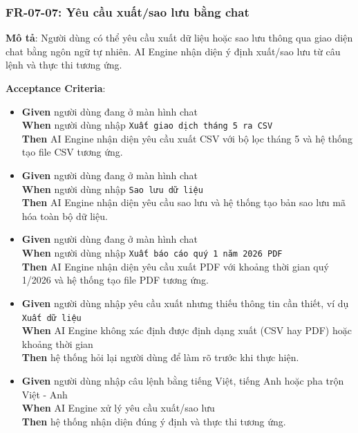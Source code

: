 \subsubsection{FR-07-07: Yêu cầu xuất/sao lưu bằng chat}

\textbf{Mô tả}: Người dùng có thể yêu cầu xuất dữ liệu hoặc sao lưu thông qua giao diện chat bằng ngôn ngữ tự nhiên. AI Engine nhận diện ý định xuất/sao lưu từ câu lệnh và thực thi tương ứng.



\textbf{Acceptance Criteria}:

\begin{itemize}
\item \textbf{Given} người dùng đang ở màn hình chat  \\ \hspace*{1.5em}  \textbf{When} người dùng nhập \texttt{Xuất giao dịch tháng 5 ra CSV}  \\ \hspace*{1.5em}  \textbf{Then} AI Engine nhận diện yêu cầu xuất CSV với bộ lọc tháng 5 và hệ thống tạo file CSV tương ứng.
\item \textbf{Given} người dùng đang ở màn hình chat  \\ \hspace*{1.5em}  \textbf{When} người dùng nhập \texttt{Sao lưu dữ liệu}  \\ \hspace*{1.5em}  \textbf{Then} AI Engine nhận diện yêu cầu sao lưu và hệ thống tạo bản sao lưu mã hóa toàn bộ dữ liệu.
\item \textbf{Given} người dùng đang ở màn hình chat  \\ \hspace*{1.5em}  \textbf{When} người dùng nhập \texttt{Xuất báo cáo quý 1 năm 2026 PDF}  \\ \hspace*{1.5em}  \textbf{Then} AI Engine nhận diện yêu cầu xuất PDF với khoảng thời gian quý 1/2026 và hệ thống tạo file PDF tương ứng.
\item \textbf{Given} người dùng nhập yêu cầu xuất nhưng thiếu thông tin cần thiết, ví dụ \texttt{Xuất dữ liệu}  \\ \hspace*{1.5em}  \textbf{When} AI Engine không xác định được định dạng xuất (CSV hay PDF) hoặc khoảng thời gian  \\ \hspace*{1.5em}  \textbf{Then} hệ thống hỏi lại người dùng để làm rõ trước khi thực hiện.
\item \textbf{Given} người dùng nhập câu lệnh bằng tiếng Việt, tiếng Anh hoặc pha trộn Việt - Anh  \\ \hspace*{1.5em}  \textbf{When} AI Engine xử lý yêu cầu xuất/sao lưu  \\ \hspace*{1.5em}  \textbf{Then} hệ thống nhận diện đúng ý định và thực thi tương ứng.

\end{itemize}

